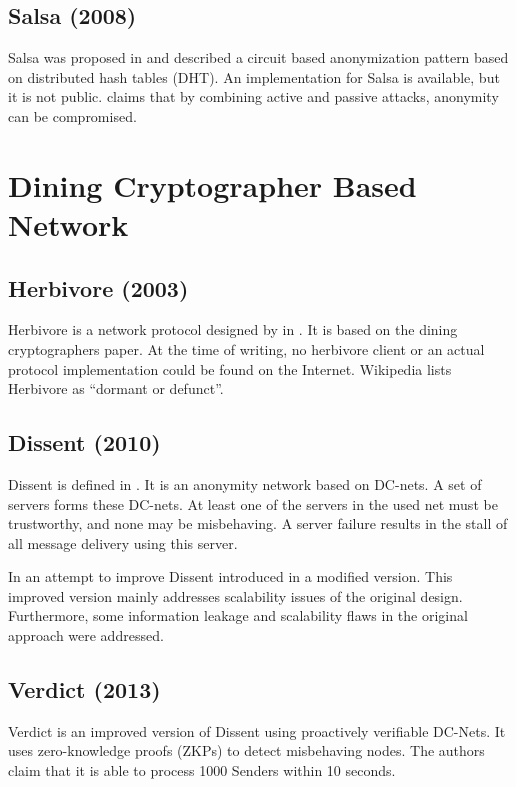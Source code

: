 \subsection{Salsa (2008)}
Salsa was proposed in \cite{Salsa} and described a circuit based anonymization pattern based on distributed hash tables (DHT). An implementation for Salsa is available, but it is not public. \cite{ccs2008:mittal} claims that by combining active and passive attacks, anonymity can be compromised.

\section{Dining Cryptographer Based Network}
\subsection{Herbivore (2003)}
Herbivore is a network protocol designed by \citeauthor{herbivore:tr} in \cite{herbivore:tr}. It is based on the dining cryptographers paper\cite{chaum-dc}. At the time of writing, no herbivore client or an actual protocol implementation could be found on the Internet. Wikipedia lists Herbivore as ``dormant or defunct''.

\subsection{Dissent (2010)}
Dissent is defined in \cite{Corrigan-Gibbs:2010:DAA:1866307.1866346}. It is an anonymity network based on DC-nets. A set of servers forms these DC-nets. At least one of the servers in the used net must be trustworthy, and none may be misbehaving. A server failure results in the stall of all message delivery using this server.

In an attempt to improve Dissent \citeauthor{wolinsky2012dissent} introduced in \cite{wolinsky2012dissent} a modified version. This improved version mainly addresses scalability issues of the original design. Furthermore, some information leakage and scalability flaws in the original approach were addressed.

\subsection{Verdict (2013)}
Verdict\cite{180367} is an improved version of Dissent using proactively verifiable DC-Nets. It uses zero-knowledge proofs (ZKPs) to detect misbehaving nodes. The authors claim that it is able to process 1000 Senders within 10 seconds.

